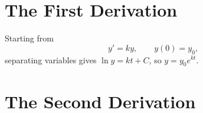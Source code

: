 
\section{The First Derivation}
Starting from
\begin{equation}
  y' = ky, \qquad y(0) = y_0,
\end{equation}
separating variables gives $\ln y = kt + C$, so $y = y_0 e^{kt}$.

\section{The Second Derivation}
\lipsum[18]
